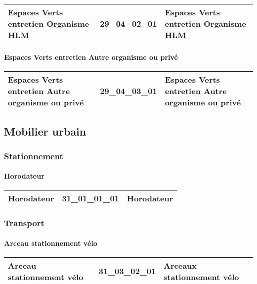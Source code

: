 \documentclass[12pt,titlepage]{book}
\begin{document}
\renewcommand{\arraystretch}{1.2}
\begin{supertabular}{|p{10cm}|c|p{15cm}|}
 Espaces Verts entretien Organisme HLM & 29\_04\_02\_01 & Espaces Verts entretien Organisme HLM\\
\hline
\end{supertabular}


\paragraph{Espaces Verts entretien Autre organisme ou privé}
\noindent
\vspace{\baselineskip}

\renewcommand{\arraystretch}{1.2}
\begin{supertabular}{|p{10cm}|c|p{15cm}|}
 Espaces Verts entretien Autre organisme ou privé & 29\_04\_03\_01 & Espaces Verts entretien Autre organisme ou privé\\
\hline
\end{supertabular}
\subsection{Mobilier urbain}
\subsubsection{\large Stationnement}
\paragraph{Horodateur}
\noindent
\vspace{\baselineskip}

\renewcommand{\arraystretch}{1.2}
\begin{supertabular}{|p{10cm}|c|p{15cm}|}
 Horodateur & 31\_01\_01\_01 & Horodateur\\
\hline
\end{supertabular}

\subsubsection{\large Transport}
\paragraph{Arceau stationnement vélo}
\noindent
\vspace{\baselineskip}

\renewcommand{\arraystretch}{1.2}
\begin{supertabular}{|p{10cm}|c|p{15cm}|}
 Arceau stationnement vélo & 31\_03\_02\_01 & Arceaux stationnement vélo\\
\hline
\end{supertabular}
\end{document}
